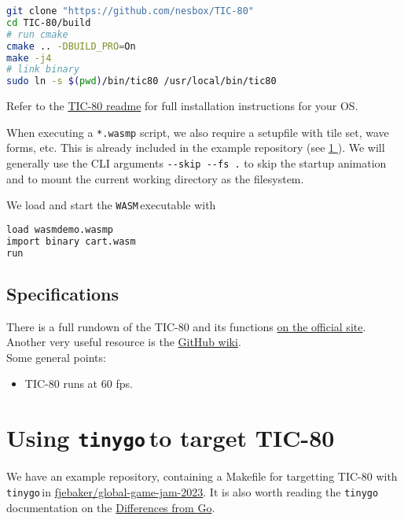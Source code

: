 \documentclass{article}
\newcommand{\tinygo}{\texttt{tinygo}\,}
\newcommand{\WASM}{\texttt{WASM}\,}
\newcommand{\fullref}[1]{\hyperref[{#1}]{\ref{#1} \nameref{#1}}}
\begin{document}
\begin{lstlisting}[language=Bash]
git clone "https://github.com/nesbox/TIC-80" 
cd TIC-80/build
# run cmake
cmake .. -DBUILD_PRO=On
make -j4
# link binary
sudo ln -s $(pwd)/bin/tic80 /usr/local/bin/tic80
\end{lstlisting}

\noindent Refer to the \href{https://github.com/nesbox/TIC-80}{TIC-80 readme} for full installation instructions for your OS.

When executing a \lstinline|*.wasmp| script, we also require a setupfile with tile set, wave forms, etc. This is already included in the example repository (see \fullref{sec:tinygo-tic80}). We will generally use the CLI arguments \lstinline|--skip --fs .| to skip the startup animation and to mount the current working directory as the filesystem. 

We load and start the \WASM executable with\\

\begin{lstlisting}[language=Bash]
load wasmdemo.wasmp 
import binary cart.wasm 
run
\end{lstlisting}

\subsection{Specifications}
\noindent There is a full rundown of the TIC-80 and its functions \href{https://tic80.com/learn}{on the official site}. Another very useful resource is the \href{https://github.com/nesbox/TIC-80/wiki}{GitHub wiki}.
\\[1em]
\noindent Some general points:
\begin{itemize}
    \item TIC-80 runs at 60 fps.
\end{itemize}

\section{Using \tinygo to target TIC-80}\label{sec:tinygo-tic80}

We have an example repository, containing a Makefile for targetting TIC-80 with \tinygo in \href{https://github.com/fjebaker/global-game-jam-2023}{fjebaker/global-game-jam-2023}. It is also worth reading the \tinygo documentation on the \href{https://tinygo.org/docs/concepts/compiler-internals/differences-from-go/}{Differences from Go}. 
\end{document}
